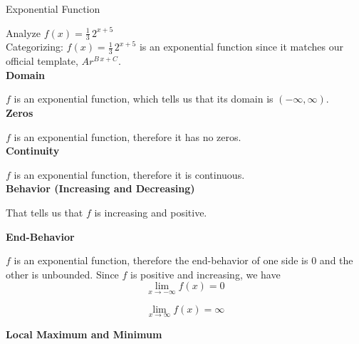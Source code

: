 \documentclass{ximera}
\begin{document}
\begin{example}  Exponential Function



Analyze   $f(x) = \frac{1}{3} \, 2^{x+5}$ \\





Categorizing: $f(x) = \frac{1}{3} \, 2^{x+5}$ is an exponential function since it matches our official template, $A r^{B \, x + C}$. \\


\textbf{Domain}

$f$ is an exponential function, which tells us that its domain is $(-\infty, \infty)$. \\


\textbf{Zeros}

$f$ is an exponential function, therefore it has no zeros. \\


\textbf{Continuity}

$f$ is an exponential function, therefore it is continuous. \\



\textbf{Behavior (Increasing and Decreasing)}



That tells us that $f$ is increasing and positive.




\textbf{End-Behavior}

$f$ is an exponential function, therefore the end-behavior of one side is $0$ and the other is unbounded. Since $f$ is positive and increasing, we have \\


\[ \lim\limits_{x \to -\infty} f(x) = 0 \]

\[ \lim\limits_{x \to \infty} f(x) = \infty\]










\textbf{Local Maximum and Minimum}


\end{example}
\end{document}

